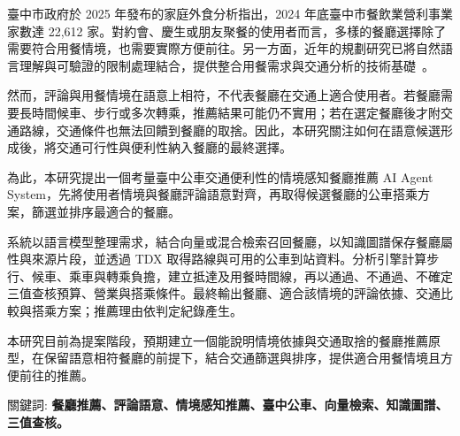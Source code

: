 
\begin{abstractzh}
臺中市政府於 2025 年發布的家庭外食分析指出，2024 年底臺中市餐飲業營利事業家數達 22,612 家。對約會、慶生或朋友聚餐的使用者而言，多樣的餐廳選擇除了需要符合用餐情境，也需要實際方便前往。另一方面，近年的規劃研究已將自然語言理解與可驗證的限制處理結合，提供整合用餐需求與交通分析的技術基礎~\cite{taichung_eat_outside,llm_planning_tools}。

然而，評論與用餐情境在語意上相符，不代表餐廳在交通上適合使用者。若餐廳需要長時間候車、步行或多次轉乘，推薦結果可能仍不實用；若在選定餐廳後才附交通路線，交通條件也無法回饋到餐廳的取捨。因此，本研究關注如何在語意候選形成後，將交通可行性與便利性納入餐廳的最終選擇。

為此，本研究提出一個考量臺中公車交通便利性的情境感知餐廳推薦 AI Agent System，先將使用者情境與餐廳評論語意對齊，再取得候選餐廳的公車搭乘方案，篩選並排序最適合的餐廳。

系統以語言模型整理需求，結合向量或混合檢索召回餐廳，以知識圖譜保存餐廳屬性與來源片段，並透過 TDX 取得路線與可用的公車到站資料。分析引擎計算步行、候車、乘車與轉乘負擔，建立抵達及用餐時間線，再以通過、不通過、不確定三值查核預算、營業與搭乘條件。最終輸出餐廳、適合該情境的評論依據、交通比較與搭乘方案；推薦理由依判定紀錄產生。

本研究目前為提案階段，預期建立一個能說明情境依據與交通取捨的餐廳推薦原型，在保留語意相符餐廳的前提下，結合交通篩選與排序，提供適合用餐情境且方便前往的推薦。

\begin{flushleft}
關鍵詞: \textbf{餐廳推薦、評論語意、情境感知推薦、臺中公車、向量檢索、知識圖譜、三值查核。}
\end{flushleft}
\end{abstractzh}

